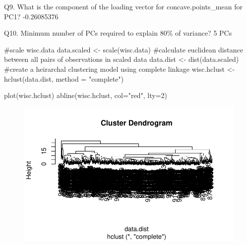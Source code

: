 \documentclass[
  letterpaper,
  DIV=11,
  numbers=noendperiod]{scrartcl}
\newenvironment{Shaded}{\begin{snugshade}}{\end{snugshade}}
\newcommand{\AttributeTok}[1]{\textcolor[rgb]{0.40,0.45,0.13}{#1}}
\newcommand{\CommentTok}[1]{\textcolor[rgb]{0.37,0.37,0.37}{#1}}
\newcommand{\DecValTok}[1]{\textcolor[rgb]{0.68,0.00,0.00}{#1}}
\newcommand{\FunctionTok}[1]{\textcolor[rgb]{0.28,0.35,0.67}{#1}}
\newcommand{\NormalTok}[1]{\textcolor[rgb]{0.00,0.23,0.31}{#1}}
\newcommand{\OtherTok}[1]{\textcolor[rgb]{0.00,0.23,0.31}{#1}}
\newcommand{\StringTok}[1]{\textcolor[rgb]{0.13,0.47,0.30}{#1}}
\begin{document}
Q9. What is the component of the loading vector for concave.points\_mean
for PC1? -0.26085376

Q10. Minimum number of PCs required to explain 80\% of variance? 5 PCs

\begin{Shaded}
\begin{Highlighting}[]
\CommentTok{\#scale wisc.data}
\NormalTok{data.scaled }\OtherTok{\textless{}{-}} \FunctionTok{scale}\NormalTok{(wisc.data)}
\CommentTok{\#calculate euclidean distance between all pairs of observations in scaled data}
\NormalTok{data.dist }\OtherTok{\textless{}{-}} \FunctionTok{dist}\NormalTok{(data.scaled)}
\CommentTok{\#create a heirarchal clustering model using complete linkage}
\NormalTok{wisc.hclust }\OtherTok{\textless{}{-}} \FunctionTok{hclust}\NormalTok{(data.dist, }\AttributeTok{method =} \StringTok{"complete"}\NormalTok{)}
\end{Highlighting}
\end{Shaded}

\begin{Shaded}
\begin{Highlighting}[]
\FunctionTok{plot}\NormalTok{(wisc.hclust)}
\FunctionTok{abline}\NormalTok{(wisc.hclust, }\AttributeTok{col=}\StringTok{"red"}\NormalTok{, }\AttributeTok{lty=}\DecValTok{2}\NormalTok{)}
\end{Highlighting}
\end{Shaded}

\begin{figure}[H]

{\centering \includegraphics{test_files/figure-pdf/unnamed-chunk-15-1.pdf}

}

\end{figure}
\end{document}

